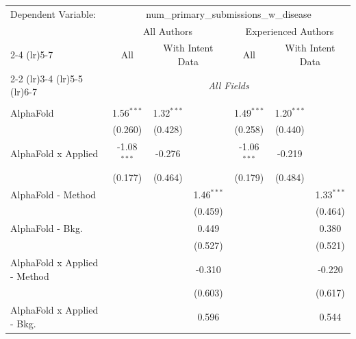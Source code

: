 \begingroup
\centering
\begin{tabular}{lcccccc}
   \tabularnewline \midrule \midrule
   Dependent Variable: & \multicolumn{6}{c}{num\_primary\_submissions\_w\_disease}\\
 & \multicolumn{3}{c}{All Authors} & \multicolumn{3}{c}{Experienced Authors} \\
\cmidrule(lr){2-4} \cmidrule(lr){5-7}
 & \multicolumn{1}{c}{All} & \multicolumn{2}{c}{With Intent Data} & \multicolumn{1}{c}{All} & \multicolumn{2}{c}{With Intent Data} \\
\cmidrule(lr){2-2} \cmidrule(lr){3-4} \cmidrule(lr){5-5} \cmidrule(lr){6-7}
 & \multicolumn{6}{c}{\textit{All Fields}} \\ \\
   AlphaFold                      & 1.56$^{***}$  & 1.32$^{***}$  &               & 1.49$^{***}$  & 1.20$^{***}$  &   \\   
                                  & (0.260)       & (0.428)       &               & (0.258)       & (0.440)       &   \\   
   AlphaFold x Applied            & -1.08$^{***}$ & -0.276        &               & -1.06$^{***}$ & -0.219        &   \\   
                                  & (0.177)       & (0.464)       &               & (0.179)       & (0.484)       &   \\   
   AlphaFold - Method             &               &               & 1.46$^{***}$  &               &               & 1.33$^{***}$\\   
                                  &               &               & (0.459)       &               &               & (0.464)\\   
   AlphaFold - Bkg.               &               &               & 0.449         &               &               & 0.380\\   
                                  &               &               & (0.527)       &               &               & (0.521)\\   
   AlphaFold x Applied - Method   &               &               & -0.310        &               &               & -0.220\\   
                                  &               &               & (0.603)       &               &               & (0.617)\\   
   AlphaFold x Applied - Bkg.     &               &               & 0.596         &               &               & 0.544\\   

\end{tabular}
